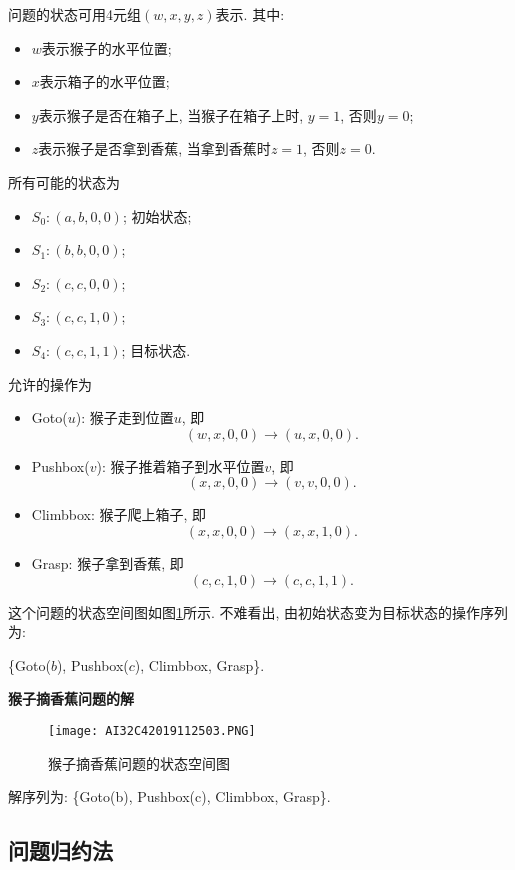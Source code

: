 \begin{result}
问题的状态可用4元组$(w, x, y, z)$表示. 其中:
\begin{itemize}
\item $w$表示猴子的水平位置;
\item $x$表示箱子的水平位置;
\item $y$表示猴子是否在箱子上, 当猴子在箱子上时, $y=1$, 否则$y=0$;
\item $z$表示猴子是否拿到香蕉, 当拿到香蕉时$z=1$, 否则$z=0$.
\end{itemize}
所有可能的状态为
\begin{itemize}
\item $S_0: (a, b, 0, 0)$;    初始状态;
\item $S_1: (b, b, 0, 0)$;
\item $S_2: (c, c, 0, 0)$;
\item $S_3: (c, c, 1, 0)$;
\item $S_4: (c, c, 1, 1)$;    目标状态.
\end{itemize}
允许的操作为
\begin{itemize}
\item Goto($u$): 猴子走到位置$u$, 即
         $$(w, x, 0, 0) \rightarrow (u, x, 0, 0).$$
\item Pushbox($v$): 猴子推着箱子到水平位置$v$, 即
         $$(x, x, 0, 0) \rightarrow (v, v, 0, 0).$$
\item Climbbox: 猴子爬上箱子, 即
         $$(x, x, 0, 0) \rightarrow (x, x, 1, 0).$$
\item Grasp: 猴子拿到香蕉, 即
         $$(c, c, 1, 0 ) \rightarrow (c, c, 1, 1).$$
\end{itemize}
这个问题的状态空间图如图\ref{AI32fig2019120224}所示. 不难看出, 由初始状态变为目标状态的操作序列为:
\begin{center}
  \{Goto($b$), Pushbox($c$), Climbbox, Grasp\}.
\end{center}
\textbf{猴子摘香蕉问题的解}
\begin{figure}[H]
\centering
\texttt{[image: AI32C42019112503.PNG]}
\caption{猴子摘香蕉问题的状态空间图}
\label{AI32fig2019120224}
\end{figure}
解序列为: \{Goto(b), Pushbox(c), Climbbox, Grasp\}.
\end{result}
\subsection{问题归约法}
